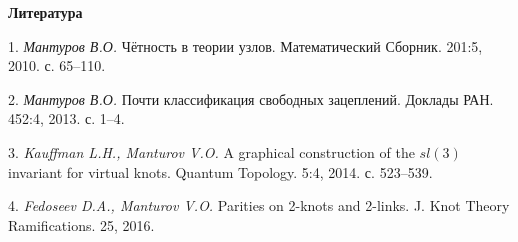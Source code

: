 \smallskip \centerline{\bf Литература}\nopagebreak

1. {\it Мантуров В.О.} Чётность в теории узлов. Математический Сборник. 201:5, 2010. с. 65--110.

2. {\it Мантуров В.О.} Почти классификация свободных зацеплений. Доклады РАН. 452:4, 2013. с. 1--4.

3. {\it Kauffman L.H., Manturov V.O.} A graphical construction of the $sl(3)$ invariant for virtual knots. Quantum Topology. 5:4, 2014. с. 523--539.

4. {\it Fedoseev D.A., Manturov V.O.} Parities on 2-knots and 2-links. J. Knot Theory Ramifications. 25, 2016.

